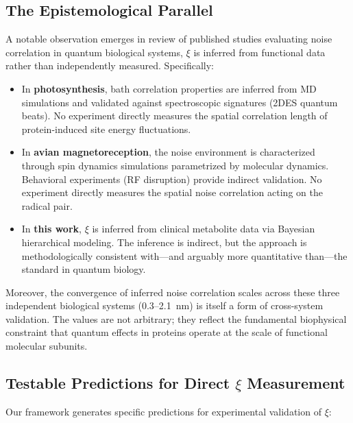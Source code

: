 \documentclass[11pt]{article}
\begin{document}
\subsection{The Epistemological Parallel}

A notable observation emerges in review of published studies evaluating noise correlation in quantum biological systems, $\xi$ is inferred from functional data rather than independently measured. Specifically:

\begin{itemize}
    \item In \textbf{photosynthesis}, bath correlation properties are inferred from MD simulations and validated against spectroscopic signatures (2DES quantum beats). No experiment directly measures the spatial correlation length of protein-induced site energy fluctuations.
    
    \item In \textbf{avian magnetoreception}, the noise environment is characterized  through spin dynamics simulations parametrized by molecular dynamics. Behavioral experiments (RF disruption) provide indirect validation. No experiment directly measures the spatial noise correlation acting on the radical pair.
    
    \item In \textbf{this work}, $\xi$ is inferred from clinical metabolite data via Bayesian hierarchical modeling. The inference is indirect, but the approach is methodologically consistent with---and arguably more quantitative than---the standard in quantum biology.
\end{itemize}

Moreover, the convergence of inferred noise correlation scales across these three independent biological systems (0.3--2.1~nm) is itself a form of cross-system validation. The values are not arbitrary; they reflect the fundamental biophysical constraint that quantum effects in proteins operate at the scale of functional molecular subunits.

\subsection{Testable Predictions for Direct \texorpdfstring{$\xi$}{xi} Measurement}

Our framework generates specific predictions for experimental validation of $\xi$:
\end{document}
